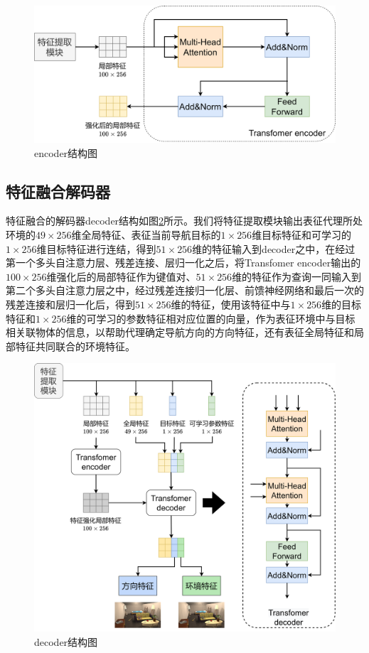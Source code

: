 \begin{figure}[htbp]
    \centering
    \includegraphics[scale=0.10]{Fig/encoder.png}
    \caption{\label{encoder}encoder结构图}
\end{figure}


\subsection{特征融合解码器}
特征融合的解码器decoder结构如图\ref{decoder}所示。我们将特征提取模块输出表征代理所处环境的$49 \times 256$维全局特征、表征当前导航目标的$1 \times 256$维目标特征和可学习的$1 \times 256$维目标特征进行连结，得到$51 \times 256$维的特征输入到decoder之中，在经过第一个多头自注意力层、残差连接、层归一化之后，将Transfomer encoder输出的$100 \times 256$维强化后的局部特征作为键值对、$51 \times 256$维的特征作为查询一同输入到第二个多头自注意力层之中，经过残差连接归一化层、前馈神经网络和最后一次的残差连接和层归一化后，得到$51 \times 256$维的特征，使用该特征中与$1 \times 256$维的目标特征和$1 \times 256$维的可学习的参数特征相对应位置的向量，作为表征环境中与目标相关联物体的信息，以帮助代理确定导航方向的方向特征，还有表征全局特征和局部特征共同联合的环境特征。
\begin{figure}[htbp]
    \centering
    \includegraphics[scale=0.10]{Fig/decoder.png}
    \caption{\label{decoder}decoder结构图}
\end{figure}


